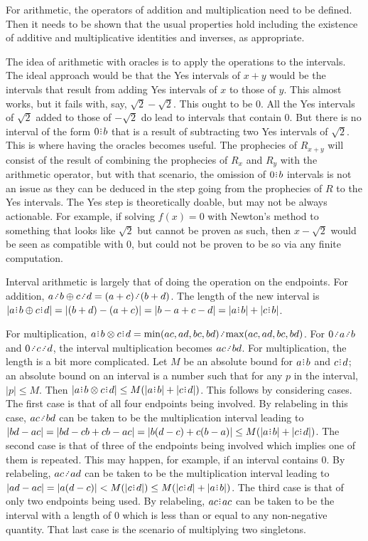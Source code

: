 \documentclass[12pt]{article}
\begin{document}
For arithmetic, the operators of addition and multiplication need to be defined. Then it needs to be shown that the usual properties hold including the existence of additive and multiplicative identities and inverses, as appropriate. 

The idea of arithmetic with oracles is to apply the operations to the intervals. The ideal approach would be that the Yes intervals of $x+y$ would be the intervals that result from adding Yes intervals of $x$ to those of $y$. This almost works, but it fails with, say, $\sqrt{2} - \sqrt{2}$. This ought to be 0. All the Yes intervals of $\sqrt{2}$ added to those of $-\sqrt{2}$ do lead to intervals that contain 0. But there is no interval of the form $0\rint b$ that is a result of subtracting two Yes intervals of $\sqrt{2}$. This is where having the oracles becomes useful. The prophecies of $R_{x+y}$ will consist of the result of combining the prophecies of $R_x$ and $R_y$ with the arithmetic operator, but with that scenario, the omission of $0\rint b$ intervals is not an issue as they can be deduced in the step going from the prophecies of $R$ to the Yes intervals. The Yes step is theoretically doable, but may not be always actionable. For example, if solving $f(x)=0$ with Newton's method to something that looks like $\sqrt{2}$ but cannot be proven as such, then $x - \sqrt{2}$ would be seen as compatible with 0, but could not be proven to be so via any finite computation. 

Interval arithmetic is largely that of doing the operation on the endpoints. For addition, $a \lte b \oplus c \lte d = (a+c) \lte (b+d)$. The length of the new interval is $|a\rint b \oplus c\rint d| = |(b+d) - (a + c)| = |b-a+ c-d| = |a\rint b|+|c\rint b|$.

For multiplication, $a\rint b \otimes c\rint d = \min(ac, ad, bc, bd)\lte \max(ac, ad, bc, bd)$. For $0 \lte a \lte b$ and $0 \lte c \lte d$, the interval multiplication becomes $ac \lte bd$. For multiplication, the length is a bit more complicated. Let $M$ be an absolute bound for $a\rint b$ and $c\rint d$; an absolute bound on an interval is a number such that for any $p$ in the interval, $|p| \leq M$. Then $|a\rint b \otimes c\rint d| \leq M(|a\rint b| + |c\rint d|)$. This follows by considering cases. The first case is that of all four endpoints being involved. By relabeling in this case,  $ac \lte bd$ can be taken to be the multiplication interval leading to $|bd - ac| = |bd - cb + cb - ac| = |b(d-c) + c (b-a)| \leq M (|a\rint b| + |c\rint d|)$. The second case is that of three of the endpoints being involved which implies one of them is repeated. This may happen, for example, if an interval contains 0. By relabeling, $ac \lte ad$ can be taken to be the multiplication interval leading to $|ad - ac| = |a(d-c)| < M (|c\rint d|) \leq M (|c\rint d| + |a\rint b|)$. The third case is that of only two endpoints being used. By relabeling, $ac\rint ac$ can be taken to be the interval with a length of 0 which is less than or equal to any non-negative quantity.  That last case is the scenario of multiplying two singletons. 
\end{document}
